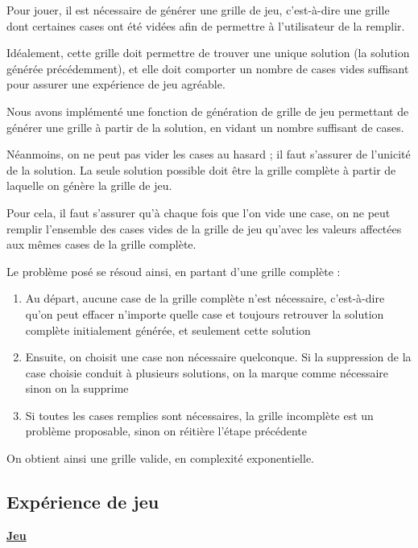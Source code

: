 \documentclass[a4paper, 12pt]{article}
\begin{document}
	\par Pour jouer, il est nécessaire de générer une grille de jeu, c'est-à-dire une grille dont certaines cases ont été vidées afin de permettre à l'utilisateur de la remplir.
	\par Idéalement, cette grille doit permettre de trouver une unique solution (la solution générée précédemment), et elle doit comporter un nombre de cases vides suffisant pour assurer une expérience de jeu agréable.
	\par Nous avons implémenté une fonction de génération de grille de jeu permettant de générer une grille à partir de la solution, en vidant un nombre suffisant de cases.
	\par Néanmoins, on ne peut pas vider les cases au hasard ; il faut s'assurer de l'unicité de la solution. La seule solution possible doit être la grille complète à partir de laquelle on génère la grille de jeu.
	\par Pour cela, il faut s'assurer qu'à chaque fois que l'on vide une case, on ne peut remplir l'ensemble des cases vides de la grille de jeu qu'avec les valeurs affectées aux mêmes cases de la grille complète.
	\par Le problème posé se résoud ainsi, en partant d'une grille complète :
	\begin{enumerate}
		\item Au départ, aucune case de la grille complète n'est nécessaire, c'est-à-dire qu'on peut effacer n'importe quelle case et toujours retrouver la solution complète initialement générée, et seulement cette solution
		\item Ensuite, on choisit une case non nécessaire quelconque. Si la suppression de la case choisie conduit à plusieurs solutions, on la marque comme nécessaire sinon on la supprime
		\item Si toutes les cases remplies sont nécessaires, la grille incomplète est un problème proposable, sinon on réitière l'étape précédente
	\end{enumerate}
	\par On obtient ainsi une grille valide, en complexité exponentielle.

\subsection{Expérience de jeu}

\underline{\textbf{Jeu}}
\end{document}
